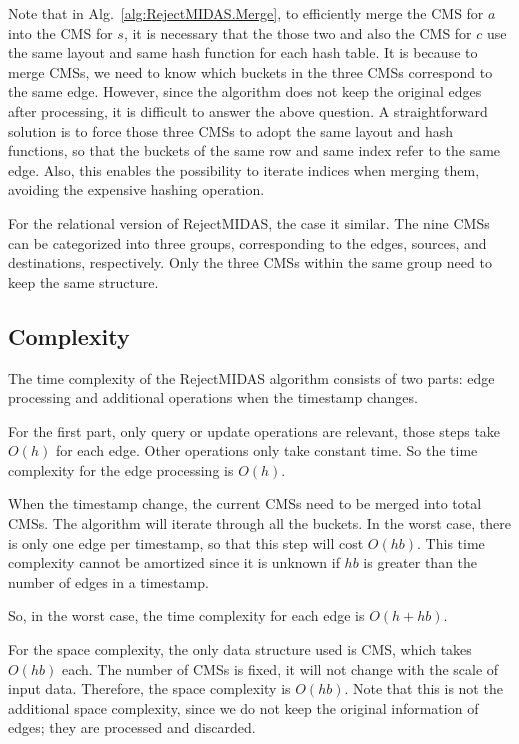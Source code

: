 \documentclass[5p]{elsarticle}
\begin{document}
	Note that in Alg.~\ref{alg:RejectMIDAS.Merge}, to efficiently merge the CMS for $a$ into the CMS for $s$, it is necessary that the those two and also the CMS for $c$ use the same layout and same hash function for each hash table. It is because to merge CMSs, we need to know which buckets in the three CMSs correspond to the same edge. However, since the algorithm does not keep the original edges after processing, it is difficult to answer the above question. A straightforward solution is to force those three CMSs to adopt the same layout and hash functions, so that the buckets of the same row and same index refer to the same edge. Also, this enables the possibility to iterate indices when merging them, avoiding the expensive hashing operation.

	For the relational version of RejectMIDAS, the case it similar. The nine CMSs can be categorized into three groups, corresponding to the edges, sources, and destinations, respectively. Only the three CMSs within the same group need to keep the same structure.

	\subsection{Complexity}

	The time complexity of the RejectMIDAS algorithm consists of two parts: edge processing and additional operations when the timestamp changes.

	For the first part, only query or update operations are relevant, those steps take $O(h)$ for each edge. Other operations only take constant time. So the time complexity for the edge processing is $O(h)$.

	When the timestamp change, the current CMSs need to be merged into total CMSs. The algorithm will iterate through all the buckets. In the worst case, there is only one edge per timestamp, so that this step will cost $O(hb)$. This time complexity cannot be amortized since it is unknown if $hb$ is greater than the number of edges in a timestamp.

	So, in the worst case, the time complexity for each edge is $O(h+hb)$.

	For the space complexity, the only data structure used is CMS, which takes $O(hb)$ each. The number of CMSs is fixed, it will not change with the scale of input data. Therefore, the space complexity is $O(hb)$. Note that this is not the additional space complexity, since we do not keep the original information of edges; they are processed and discarded.
\end{document}
